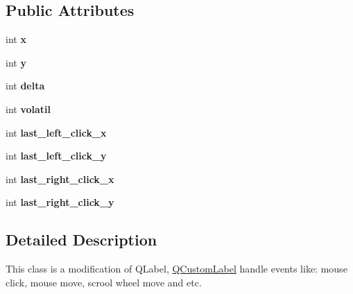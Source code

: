 \subsection*{Public Attributes}
\begin{DoxyCompactItemize}
\item 
int {\bfseries x}\hypertarget{classQCustomLabel_a509c6eb2bc4e80ad72901c1afc976b92}{}\label{classQCustomLabel_a509c6eb2bc4e80ad72901c1afc976b92}

\item 
int {\bfseries y}\hypertarget{classQCustomLabel_a3d3309c76e47ccba7101e5504091804c}{}\label{classQCustomLabel_a3d3309c76e47ccba7101e5504091804c}

\item 
int {\bfseries delta}\hypertarget{classQCustomLabel_a64b5c030bb65139b76f063de1d0784bf}{}\label{classQCustomLabel_a64b5c030bb65139b76f063de1d0784bf}

\item 
int {\bfseries volatil}\hypertarget{classQCustomLabel_a0eaa0290c071a33d058883a8adc9e0fb}{}\label{classQCustomLabel_a0eaa0290c071a33d058883a8adc9e0fb}

\item 
int {\bfseries last\+\_\+left\+\_\+click\+\_\+x}\hypertarget{classQCustomLabel_a5fa4f875b266bd86a552867e60be86da}{}\label{classQCustomLabel_a5fa4f875b266bd86a552867e60be86da}

\item 
int {\bfseries last\+\_\+left\+\_\+click\+\_\+y}\hypertarget{classQCustomLabel_abb541cfa1a5ceb23f29bc08573838bcd}{}\label{classQCustomLabel_abb541cfa1a5ceb23f29bc08573838bcd}

\item 
int {\bfseries last\+\_\+right\+\_\+click\+\_\+x}\hypertarget{classQCustomLabel_a7b13426cb8aedd2d0af1d55502d61325}{}\label{classQCustomLabel_a7b13426cb8aedd2d0af1d55502d61325}

\item 
int {\bfseries last\+\_\+right\+\_\+click\+\_\+y}\hypertarget{classQCustomLabel_a85b2496bc41541923c82ef03894885a7}{}\label{classQCustomLabel_a85b2496bc41541923c82ef03894885a7}

\end{DoxyCompactItemize}


\subsection{Detailed Description}
This class is a modification of Q\+Label, \hyperlink{classQCustomLabel}{Q\+Custom\+Label} handle events like\+: mouse click, mouse move, scrool wheel move and etc. 

